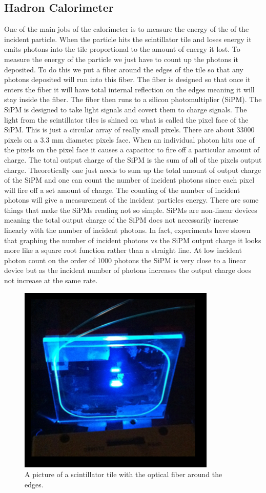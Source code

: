 \subsection{Hadron Calorimeter}
One of the main jobs of the calorimeter is to measure the energy of the of the incident particle. When the particle hits the scintillator tile and loses energy it emits photons into the tile proportional to the amount of energy it lost. To measure the energy of the particle we just have to count up the photons it deposited. To do this we put a fiber around the edges of the tile so that any photons deposited will run into this fiber. The fiber is designed so that once it enters the fiber it will have total internal reflection on the edges meaning it will stay inside the fiber. The fiber then runs to a silicon photomultiplier (SiPM). The SiPM is designed to take light signals and covert them to charge signals. The light from the scintillator tiles is shined on what is called the pixel face of the SiPM. This is just a circular array of really small pixels. There are about 33000 pixels on a 3.3 mm diameter pixels face. When an individual photon hits one of the pixels on the pixel face it causes a capacitor to fire off a particular amount of charge. The total output charge of the SiPM is the sum of all of the pixels output charge. Theoretically one just needs to sum up the total amount of output charge of the SiPM and one can count the number of incident photons since each pixel will fire off a set amount of charge. The counting of the number of incident photons will give a measurement of the incident particles energy. There are some things that make the SiPMs reading not so simple. SiPMs are non-linear devices meaning the total output charge of the SiPM does not necessarily increase linearly with the number of incident photons. In fact, experiments have shown that graphing the number of incident photons vs the SiPM output charge it looks more like a square root function rather than a straight line. At low incident photon count on the order of 1000 photons the SiPM is very close to a linear device but as the incident number of photons increases the output charge does not increase at the same rate.

\begin{figure}
\centering
\includegraphics[width=0.6\linewidth]{Figures/Tile.png}
\caption{A picture of a scintillator tile with the optical fiber around the edges.}
\label{fig:Tile}
\end{figure}

